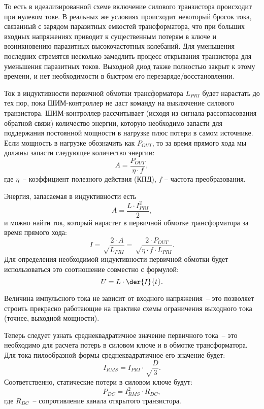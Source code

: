 То есть в идеализированной схеме включение силового транзистора происходит при нулевом
токе. В реальных же условиях происходит некоторый бросок тока, связанный с
зарядом паразитных емкостей трансформатора, что при больших входных напряжениях
приводит к существенным потерям в ключе и возникновению паразитных
высокочастотных колебаний. Для уменьшения последних стремятся несколько
замедлить процесс открывания транзистора для уменьшения паразитных токов.
Выходной диод также полностью закрыт к этому времени, и нет необходимости в
быстром его перезаряде/восстановлении.

Ток в индуктивности первичной обмотки трансформатора \( L_{PRI} \) будет
нарастать до тех пор, пока ШИМ-контроллер не даст команду на выключение силового
транзистора. ШИМ-контроллер рассчитывает (исходя из сигнала рассогласования
обратной связи) количество энергии, которую необходимо запасти для поддержания
постоянной мощности в нагрузке плюс потери в самом источнике. Если мощность в
нагрузке обозначить как \( P_{OUT} \), то за время прямого хода мы должны
запасти следующее количество энергии:
\begin{equation}
	A = \frac{P_{OUT}}{\eta\cdot f},
\end{equation}
где \( \eta \)~-- коэффициент полезного действия (КПД), \( f \) -- частота
преобразования.

Энергия, запасаемая в индуктивности есть
\begin{equation}
	A = \frac{L\cdot I_{PRI}^2}{2},
\end{equation}
и можно найти ток, который нарастет в первичной обмотке трансформатора за время
прямого хода:
\begin{equation}
	I = \sqrt\frac{2\cdot A}{L_{PRI}} = \sqrt\frac{2\cdot P_{OUT}}
	{\eta\cdot f\cdot L_{PRI}}.
\end{equation}
Для определения необходимой индуктивности первичной обмотки будет
использоваться это соотношение совместно с формулой:
\begin{equation}
	U = L\cdot\der{I}{t}.
\end{equation}

Величина импульсного тока не зависит от входного напряжения~-- это позволяет
строить прекрасно работающие на практике схемы ограничения выходного тока
(точнее, выходной мощности).

Теперь следует узнать среднеквадратичное значение первичного тока~-- это
необходимо для расчета потерь в силовом ключе и в обмотке трансформатора. Для
тока пилообразной формы среднеквадратичное его значение будет:
\begin{equation}
	I_{RMS} = I_{PRI}\cdot\sqrt\frac{D}{3}.
\end{equation}
Соответственно, статические потери в силовом ключе будут:
\begin{equation}
	P_{DC} = I_{RMS}^2\cdot R_{DC},
\end{equation}
где \( R_{DC} \)~-- сопротивление канала открытого транзистора.

